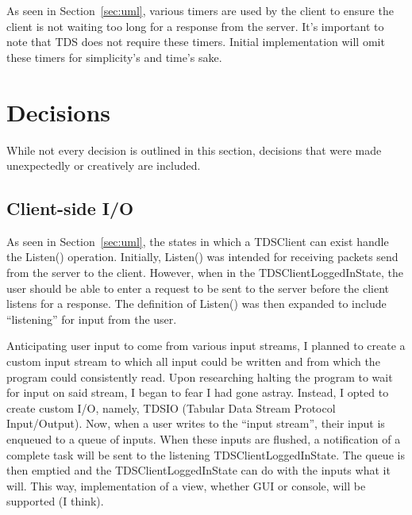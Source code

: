 \documentclass{article}
\begin{document}
        As seen in Section~\ref{sec:uml}, various timers are used by the client to ensure the client is not waiting too long for a response from the server. It's important to note that TDS does not require these timers. Initial implementation will omit these timers for simplicity's and time's sake.

\section{Decisions}\label{sec:dec}
    While not every decision is outlined in this section, decisions that were made unexpectedly or creatively are included.

    \subsection{Client-side I/O}\label{sec:dec:clientio}
        As seen in Section~\ref{sec:uml}, the states in which a TDSClient can exist handle the Listen() operation. Initially, Listen() was intended for receiving packets send from the server to the client. However, when in the TDSClientLoggedInState, the user should be able to enter a request to be sent to the server before the client listens for a response. The definition of Listen() was then expanded to include ``listening'' for input from the user.

        Anticipating user input to come from various input streams, I planned to create a custom input stream to which all input could be written and from which the program could consistently read. Upon researching halting the program to wait for input on said stream, I began to fear I had gone astray. Instead, I opted to create custom I/O, namely, TDSIO (Tabular Data Stream Protocol Input/Output). Now, when a user writes to the ``input stream'', their input is enqueued to a queue of inputs. When these inputs are flushed, a notification of a complete task will be sent to the listening TDSClientLoggedInState. The queue is then emptied and the TDSClientLoggedInState can do with the inputs what it will. This way, implementation of a view, whether GUI or console, will be supported (I think).

\end{document}
